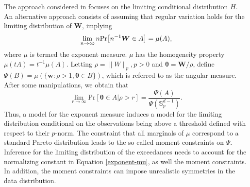 The approach considered in \cite{rootzen2018} focuses on the limiting
conditional distribution $H$. An alternative approach consists of assuming
that regular variation \cite[see, for example,][]{resnick2008extreme} holds for 
the limiting distribution of $\bm{W}$, implying
\[
    \lim\limits_{n\rightarrow\infty} n \prob{n^{-1} \bm{W}\in A} = 
    \mu(A),
\]
where $\mu$ is termed the exponent measure. $\mu$ has the homogeneity property
$\mu(tA) = t^{-1}\mu(A)$. Letting $\rho = \|W\|_p, p>0$ 
and $\bm{\theta} = \bm{W}/\rho$, define  $\Psi(B) = \mu(\{\bm{w} : \rho>1, 
\bm{\theta} \in B\})$, which is referred to as the angular measure. After 
some manipulations, we obtain that
\begin{equation}
\label{exponent-mu}
    \lim\limits_{r\rightarrow\infty} \text{Pr}\left[\bm{\theta}\in A \rvert \rho>r\right] = 
    \frac{\Psi(A)}{\Psi({\mathbb S}_p^{d-1})} .
\end{equation}
Thus, a model for the exponent measure induces a model for the limiting distribution
conditional on the observations being above a threshold defined with respect
to their $p$-norm. The constraint that all marginals of $\mu$ correspond to a
standard Pareto distribution leads to the so called moment constraints on $\Psi$. 
Inference for the limiting distribution of the exceedances
needs to account for the normalizing constant in Equation \ref{exponent-mu}, as well
the moment constraints. In addition, the moment constraints can impose unrealistic
symmetries in the data distribution.


